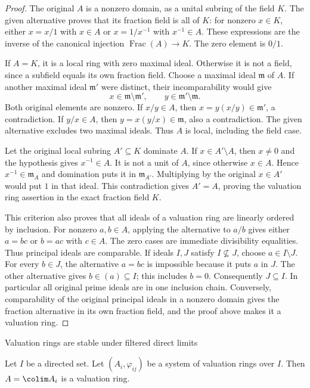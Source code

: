 \begin{proof}
The original $A$ is a nonzero
domain, as a unital subring
of the field $K$. The given
alternative proves that its
fraction field is all of $K$:
for nonzero $x\in K$, either
$x=x/1$ with $x\in A$ or
$x=1/x^{-1}$ with $x^{-1}\in A$.
These expressions are the
inverse of the canonical
injection $\operatorname{Frac}(A)\to K$.
The zero element is $0/1$.

If $A=K$, it is a local
ring with zero maximal ideal.
Otherwise it is not a field,
since a subfield equals its
own fraction field. Choose
a maximal ideal $\mathfrak m$
of $A$. If another maximal
ideal $\mathfrak m'$ were
distinct, their incomparability
would give
$$
x\in\mathfrak m\setminus\mathfrak m',\qquad
y\in\mathfrak m'\setminus\mathfrak m.
$$
Both original elements are
nonzero. If $x/y\in A$,
then $x=y(x/y)\in\mathfrak m'$,
a contradiction. If $y/x\in A$,
then $y=x(y/x)\in\mathfrak m$,
also a contradiction. The
given alternative excludes
two maximal ideals. Thus
$A$ is local, including
the field case.

Let the original local subring
$A'\subseteq K$ dominate $A$.
If $x\in A'\setminus A$,
then $x\neq0$ and the
hypothesis gives $x^{-1}\in A$.
It is not a unit of $A$,
since otherwise $x\in A$.
Hence $x^{-1}\in\mathfrak m_A$
and domination puts it in
$\mathfrak m_{A'}$. Multiplying
by the original $x\in A'$
would put $1$ in that ideal.
This contradiction gives
$A'=A$, proving the valuation
ring assertion in the exact
fraction field $K$.

This criterion also proves
that all ideals of a valuation
ring are linearly ordered
by inclusion. For nonzero
$a,b\in A$, applying the
alternative to $a/b$ gives
either $a=bc$ or $b=ac$
with $c\in A$. The zero
cases are immediate divisibility
equalities. Thus principal
ideals are comparable. If
ideals $I,J$ satisfy
$I\not\subseteq J$, choose
$a\in I\setminus J$.
For every $b\in J$, the
alternative $a=bc$ is
impossible because it puts
$a$ in $J$. The other
alternative gives $b\in(a)\subseteq I$;
this includes $b=0$.
Consequently $J\subseteq I$.
In particular all original
prime ideals are in one
inclusion chain. Conversely,
comparability of the original
principal ideals in a nonzero
domain gives the fraction
alternative in its own
fraction field, and the proof
above makes it a valuation ring.
\end{proof}

\begin{lemma}
\label{lemma-colimit-valuation-rings}
\begin{slogan}
Valuation rings are stable under filtered direct limits
\end{slogan}
Let $I$ be a directed set. Let $(A_i, \varphi_{ij})$
be a system of valuation rings over $I$.
Then $A = \colim A_i$ is a valuation ring.
\end{lemma}

